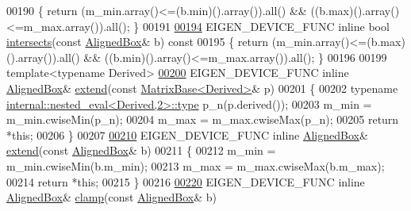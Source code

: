 \begin{DoxyCode}
00190 \textcolor{keyword}{  }\{ \textcolor{keywordflow}{return} (m\_min.array()<=(b.min)().array()).all() && ((b.max)().array()<=m\_max.array()).all(); \}
00191 
\hyperlink{group___geometry___module_a75a5af80f40892bfa267c0245f0d4d12}{00194}   EIGEN\_DEVICE\_FUNC \textcolor{keyword}{inline} \textcolor{keywordtype}{bool} \hyperlink{group___geometry___module_a75a5af80f40892bfa267c0245f0d4d12}{intersects}(\textcolor{keyword}{const} \hyperlink{group___geometry___module_class_eigen_1_1_aligned_box}{AlignedBox}& b)\textcolor{keyword}{ const}
00195 \textcolor{keyword}{  }\{ \textcolor{keywordflow}{return} (m\_min.array()<=(b.max)().array()).all() && ((b.min)().array()<=m\_max.array()).all(); \}
00196 
00199   \textcolor{keyword}{template}<\textcolor{keyword}{typename} Derived>
\hyperlink{group___geometry___module_a6dfe79aa0435d6db3ed06b0e3b9f79b6}{00200}   EIGEN\_DEVICE\_FUNC \textcolor{keyword}{inline} \hyperlink{group___geometry___module_class_eigen_1_1_aligned_box}{AlignedBox}& \hyperlink{group___geometry___module_a6dfe79aa0435d6db3ed06b0e3b9f79b6}{extend}(\textcolor{keyword}{const} 
      \hyperlink{group___core___module_class_eigen_1_1_matrix_base}{MatrixBase<Derived>}& p)
00201   \{
00202     \textcolor{keyword}{typename} \hyperlink{class_eigen_1_1internal_1_1_tensor_lazy_evaluator_writable}{internal::nested\_eval<Derived,2>::type} p\_n(p.derived());
00203     m\_min = m\_min.cwiseMin(p\_n);
00204     m\_max = m\_max.cwiseMax(p\_n);
00205     \textcolor{keywordflow}{return} *\textcolor{keyword}{this};
00206   \}
00207 
\hyperlink{group___geometry___module_ace56bb9d36d9b3e15fb50df80272ed77}{00210}   EIGEN\_DEVICE\_FUNC \textcolor{keyword}{inline} \hyperlink{group___geometry___module_class_eigen_1_1_aligned_box}{AlignedBox}& \hyperlink{group___geometry___module_ace56bb9d36d9b3e15fb50df80272ed77}{extend}(\textcolor{keyword}{const} \hyperlink{group___geometry___module_class_eigen_1_1_aligned_box}{AlignedBox}& b)
00211   \{
00212     m\_min = m\_min.cwiseMin(b.m\_min);
00213     m\_max = m\_max.cwiseMax(b.m\_max);
00214     \textcolor{keywordflow}{return} *\textcolor{keyword}{this};
00215   \}
00216 
\hyperlink{group___geometry___module_a7df756eb446280c7d738ac5ce73d4032}{00220}   EIGEN\_DEVICE\_FUNC \textcolor{keyword}{inline} \hyperlink{group___geometry___module_class_eigen_1_1_aligned_box}{AlignedBox}& \hyperlink{group___geometry___module_a7df756eb446280c7d738ac5ce73d4032}{clamp}(\textcolor{keyword}{const} \hyperlink{group___geometry___module_class_eigen_1_1_aligned_box}{AlignedBox}& b)

\end{DoxyCode}
